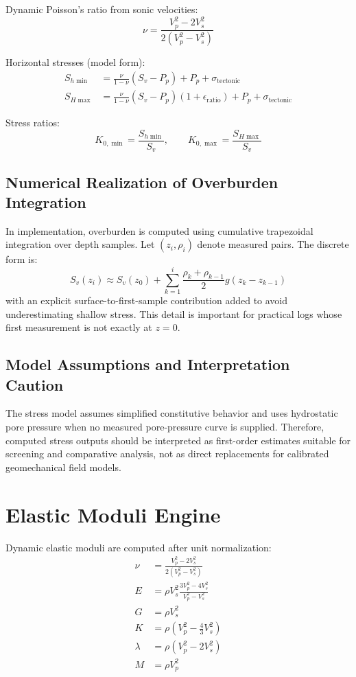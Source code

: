 \documentclass[12pt,a4paper]{report}
\begin{document}
Dynamic Poisson's ratio from sonic velocities:
\begin{equation}
\nu = \frac{V_p^2 - 2V_s^2}{2\left(V_p^2 - V_s^2\right)}
\end{equation}

Horizontal stresses (model form):
\begin{align}
S_{h\min} &= \frac{\nu}{1-\nu}(S_v - P_p) + P_p + \sigma_{\mathrm{tectonic}} \\
S_{H\max} &= \frac{\nu}{1-\nu}(S_v - P_p)(1+\epsilon_{\mathrm{ratio}}) + P_p + \sigma_{\mathrm{tectonic}}
\end{align}

Stress ratios:
\begin{equation}
K_{0,\min}=\frac{S_{h\min}}{S_v},\qquad K_{0,\max}=\frac{S_{H\max}}{S_v}
\end{equation}

\subsection{Numerical Realization of Overburden Integration}
In implementation, overburden is computed using cumulative trapezoidal integration over depth samples. Let $(z_i, \rho_i)$ denote measured pairs. The discrete form is:
\begin{equation}
S_v(z_i) \approx S_v(z_0) + \sum_{k=1}^{i} \frac{\rho_k + \rho_{k-1}}{2}g(z_k-z_{k-1})
\end{equation}
with an explicit surface-to-first-sample contribution added to avoid underestimating shallow stress. This detail is important for practical logs whose first measurement is not exactly at $z=0$.

\subsection{Model Assumptions and Interpretation Caution}
The stress model assumes simplified constitutive behavior and uses hydrostatic pore pressure when no measured pore-pressure curve is supplied. Therefore, computed stress outputs should be interpreted as first-order estimates suitable for screening and comparative analysis, not as direct replacements for calibrated geomechanical field models.

\section{Elastic Moduli Engine}
Dynamic elastic moduli are computed after unit normalization:
\begin{align}
\nu &= \frac{V_p^2 - 2V_s^2}{2(V_p^2 - V_s^2)} \\
E &= \rho V_s^2 \frac{3V_p^2 - 4V_s^2}{V_p^2 - V_s^2} \\
G &= \rho V_s^2 \\
K &= \rho\left(V_p^2 - \frac{4}{3}V_s^2\right) \\
\lambda &= \rho(V_p^2 - 2V_s^2) \\
M &= \rho V_p^2
\end{align}
\end{document}
